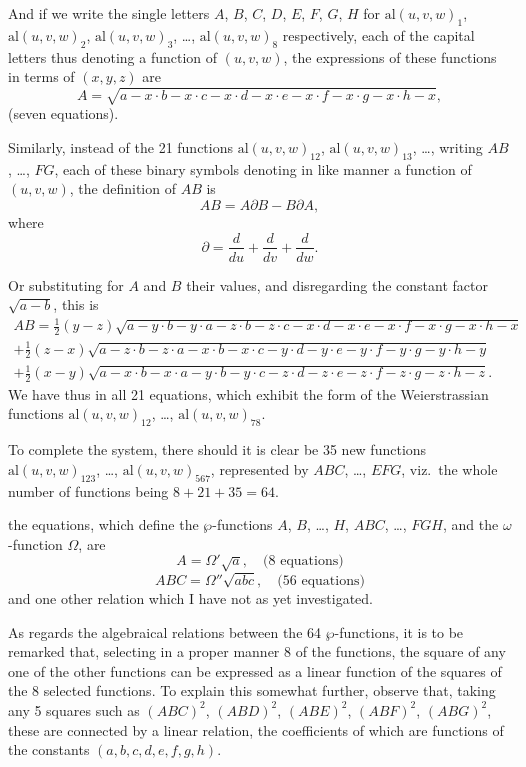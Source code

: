 \documentclass[11pt,a4paper]{article}
\begin{document}
And if we write the single letters $A$, $B$, $C$, $D$, $E$, $F$, $G$, $H$ for $\mathrm{al}(u, v, w)_1$, $\mathrm{al}(u, v, w)_2$, $\mathrm{al}(u, v, w)_3$, \dots, $\mathrm{al}(u, v, w)_8$ respectively, each of the capital letters thus denoting a function of $(u, v, w)$, the expressions of these functions in terms of $(x, y, z)$ are
\[
A = \sqrt{a - x \cdot b - x \cdot c - x \cdot d - x \cdot e - x \cdot f - x \cdot g - x \cdot h - x},
\]
(seven equations).

\clearpage
Similarly, instead of the 21 functions $\mathrm{al}(u, v, w)_{12}$, $\mathrm{al}(u, v, w)_{13}$, \dots, writing $AB$, \dots, $FG$, each of these binary symbols denoting in like manner a function of $(u, v, w)$, the definition of $AB$ is
\[
AB = A\partial B - B\partial A,
\]
where
\[
\partial = \frac{d}{du} + \frac{d}{dv} + \frac{d}{dw}.
\]

\clearpage
Or substituting for $A$ and $B$ their values, and disregarding the constant factor $\sqrt{a - b}$, this is
\begin{multline*}
AB = \tfrac{1}{2}(y - z)\sqrt{a - y \cdot b - y \cdot a - z \cdot b - z \cdot c - x \cdot d - x \cdot e - x \cdot f - x \cdot g - x \cdot h - x} \\
+ \tfrac{1}{2}(z - x)\sqrt{a - z \cdot b - z \cdot a - x \cdot b - x \cdot c - y \cdot d - y \cdot e - y \cdot f - y \cdot g - y \cdot h - y} \\
+ \tfrac{1}{2}(x - y)\sqrt{a - x \cdot b - x \cdot a - y \cdot b - y \cdot c - z \cdot d - z \cdot e - z \cdot f - z \cdot g - z \cdot h - z}.
\end{multline*}
We have thus in all 21 equations, which exhibit the form of the Weierstrassian functions $\mathrm{al}(u, v, w)_{12}$, \dots, $\mathrm{al}(u, v, w)_{78}$.

To complete the system, there should it is clear be 35 new functions $\mathrm{al}(u, v, w)_{123}$, \dots, $\mathrm{al}(u, v, w)_{567}$, represented by $ABC$, \dots, $EFG$, viz.\ the whole number of functions being $8 + 21 + 35 = 64$.

\clearpage
the equations, which define the $\wp$-functions $A$, $B$, \dots, $H$, $ABC$, \dots, $FGH$, and the $\omega$-function $\Omega$, are
\[
A = \Omega'\sqrt{a}, \quad \text{(8 equations)}
\]
\[
ABC = \Omega''\sqrt{abc}, \quad \text{(56 equations)}
\]
and one other relation which I have not as yet investigated.

As regards the algebraical relations between the 64 $\wp$-functions, it is to be remarked that, selecting in a proper manner 8 of the functions, the square of any one of the other functions can be expressed as a linear function of the squares of the 8 selected functions. To explain this somewhat further, observe that, taking any 5 squares such as $(ABC)^2$, $(ABD)^2$, $(ABE)^2$, $(ABF)^2$, $(ABG)^2$, these are connected by a linear relation, the coefficients of which are functions of the constants $(a, b, c, d, e, f, g, h)$.
\end{document}
